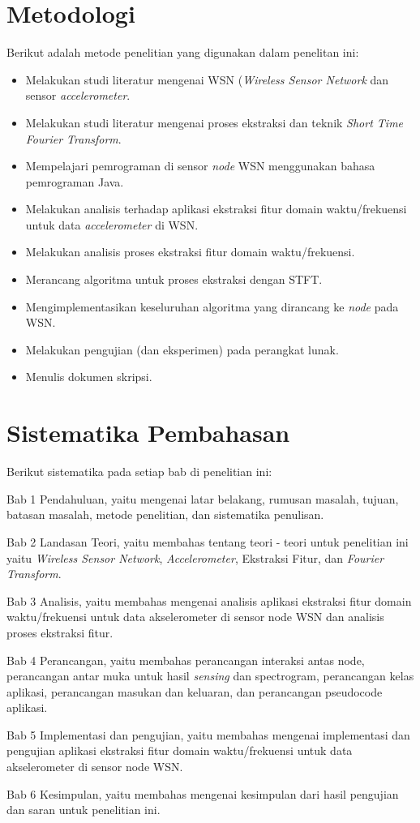 \section{Metodologi}
\label{sec:metlit}
Berikut adalah metode penelitian yang digunakan dalam penelitan ini:
\begin{itemize}
	\item Melakukan studi literatur mengenai WSN ({\it Wireless Sensor Network} dan sensor {\it accelerometer}.
	\item Melakukan studi literatur mengenai proses ekstraksi dan teknik {\it Short Time Fourier Transform}.
	\item Mempelajari pemrograman di sensor {\it node} WSN menggunakan bahasa pemrograman Java.
	\item Melakukan analisis terhadap aplikasi ekstraksi fitur domain waktu/frekuensi untuk data {\it accelerometer} di WSN.
	\item Melakukan analisis proses ekstraksi fitur domain waktu/frekuensi.
	\item Merancang algoritma untuk proses ekstraksi dengan STFT.
	\item Mengimplementasikan keseluruhan algoritma yang dirancang ke {\it node} pada WSN.
	\item Melakukan pengujian (dan eksperimen) pada perangkat lunak.
	\item Menulis dokumen skripsi.
\end{itemize}

\section{Sistematika Pembahasan}
\label{sec:sispem}
Berikut sistematika pada setiap bab di penelitian ini:

Bab 1 Pendahuluan, yaitu mengenai latar belakang, rumusan masalah, tujuan, batasan masalah, metode penelitian, dan sistematika penulisan.

Bab 2 Landasan Teori, yaitu membahas tentang teori - teori untuk penelitian ini yaitu {\it Wireless Sensor Network}, {\it Accelerometer}, Ekstraksi Fitur, dan {\it Fourier Transform}.

Bab 3 Analisis, yaitu membahas mengenai analisis aplikasi ekstraksi fitur domain waktu/frekuensi untuk data akselerometer di sensor node WSN dan analisis proses ekstraksi fitur.

Bab 4 Perancangan, yaitu membahas perancangan interaksi antas node, perancangan antar muka untuk hasil {\it sensing} dan spectrogram, perancangan kelas aplikasi, perancangan masukan dan keluaran, dan perancangan pseudocode aplikasi.

Bab 5 Implementasi dan pengujian, yaitu membahas mengenai implementasi dan pengujian aplikasi ekstraksi fitur domain waktu/frekuensi untuk data akselerometer di sensor node WSN.

Bab 6 Kesimpulan, yaitu membahas mengenai kesimpulan dari hasil pengujian dan saran untuk penelitian ini.